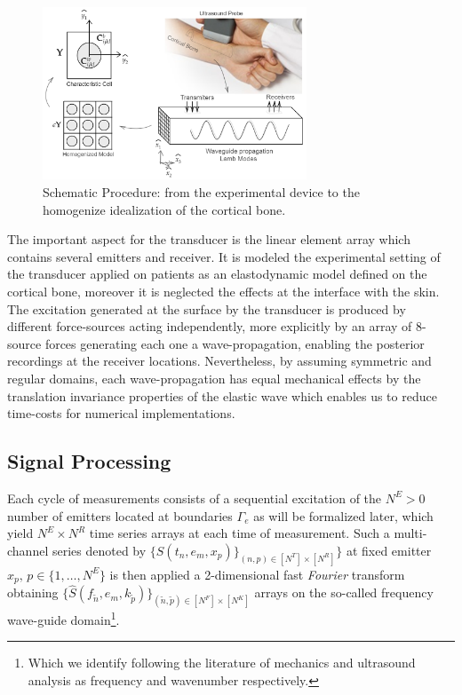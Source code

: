 \begin{figure}[!h]
	\centering
	\includegraphics[width=0.7\textwidth]{images/ImgExt/SchematicPropagation.png}
	\caption{Schematic Procedure: from the experimental device to the homogenize idealization of the cortical bone.}
	\label{SchematicProp&Hom}
\end{figure} 

The important aspect for the transducer is the linear element array which contains several emitters and receiver. It is modeled the experimental setting of the transducer applied on patients as an elastodynamic model defined on the cortical bone, moreover it is neglected the effects at the interface with the skin. The excitation generated at the surface by the transducer is produced by different force-sources acting independently, more explicitly by an array of 8-source forces generating each one a wave-propagation, enabling the posterior recordings at the receiver locations. Nevertheless, by assuming symmetric and regular domains, each wave-propagation has equal mechanical effects by the translation invariance properties of the elastic wave which enables us to reduce time-costs for numerical implementations. 

\subsection{Signal Processing}
Each cycle of measurements consists of a sequential excitation of the $N^E > 0$ number of emitters located at boundaries $\Gamma_{e}$ as will be formalized later, which yield $N^E \times N^R$ time series arrays at each time of measurement.
Such a multi-channel series denoted by $\{ S(t_n, e_m,x_p) \}_{(n,p) \in [N^T]\times [N^R]}\}$ at fixed emitter $x_p, \, p \in \{1, \dots, N^E\}$ is then applied a 2-dimensional fast \textit{Fourier} transform obtaining $\{ \hat{S}(f_{\tilde{n}},e_m,k_{\tilde{p}}) \}_{(\tilde{n},\tilde{p}) \in [N^F]\times [N^K]}$ arrays on the so-called frequency wave-guide domain\footnote{Which we identify following the literature of mechanics and ultrasound analysis as frequency and wavenumber respectively.}.

